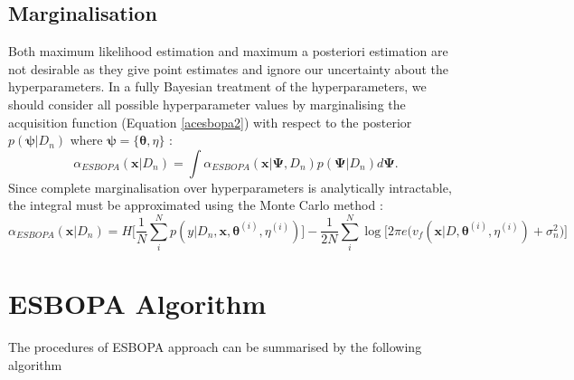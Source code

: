 \documentclass[a4paper,11pt]{report}
\begin{document}
\subsection{Marginalisation}
Both maximum likelihood estimation and maximum a posteriori estimation are not desirable as they give point estimates and ignore our uncertainty about the hyperparameters. In a fully Bayesian treatment of the hyperparameters, we should consider all possible hyperparameter values by marginalising the acquisition function (Equation \ref{acesbopa2}) with respect to the posterior  $p(\boldsymbol{\psi} \vert D_n )$ where $\boldsymbol{\psi}=\{\boldsymbol{\theta}, \eta\}$ :
 	 \begin{equation}
	 \alpha_{ESBOPA}(\mathbf{x} \vert D_n) = \int  \alpha_{ESBOPA}(\mathbf{x} \vert \boldsymbol{\Psi} , D_n ) p ( \boldsymbol{\Psi} \vert D_n) d\boldsymbol{\Psi}.
	 \end{equation}
Since complete marginalisation over hyperparameters is analytically intractable, the integral must be approximated using the Monte Carlo method \cite{hoffman2015} \cite{snoek2012practical}: 
	  \begin{equation}
\alpha_{ESBOPA}(\mathbf{x} \vert D_n) = H \Big[  \frac{1}{N} \sum_i^{N} p(y \vert D_n,\mathbf{x},\boldsymbol{\theta}^{(i)}, \eta^{(i)}) \Big] -  \frac{1}{2N} \sum_i^{N} \log \big[ 2\pi e \big(v_f(\mathbf{x} \vert D, \boldsymbol{\theta}^{(i)}, \eta^{(i)})+\sigma_n^2 \big) \big] 
   	  \end{equation}

\section{ESBOPA Algorithm}
The procedures of ESBOPA approach can be summarised by the following algorithm
\end{document}

